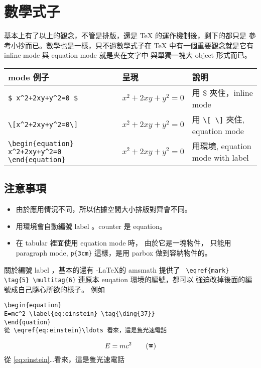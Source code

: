 \chapter{數學式子}
基本上有了以上的觀念，不管是排版，還是 {\TeX} 的運作機制後，剩下的都只是
參考小抄而已。數學也是一樣，只不過數學式子在 {\TeX} 中有一個重要觀念就是它有
inline mode 與 equation mode 就是夾在文字中 與單獨一塊大 object 形式而已。
\begin{center}
\begin{tabular}{m{3cm}m{4cm}m{3cm}}
mode 例子 & 呈現 & 說明\\
\hline
\verb|$ x^2+2xy+y^2=0 $|&$x^2+2xy+y^2=0 $& 用 \$ 夾住，inline mode\\
\verb|\[x^2+2xy+y^2=0\]|&\[x^2+2xy+y^2=0\]& 用 \verb=\[ \]= 夾住, equation mode\\
\verb|\begin{equation}|
\verb|x^2+2xy+y^2=0|
\verb|\end{equation}|&\begin{equation}x^2+2xy+y^2=0\end{equation}&
	 用環境, equation mode with label \\
\end{tabular}
\end{center}

\section{注意事項}
\begin{itemize}
\item 由於應用情況不同，所以佔據空間大小排版對齊會不同。
\item 用環境會自動編號 label 。counter 是 equation。
\item 在 tabular 裡面使用 equation mode 時， 由於它是一塊物件，
      只能用 paragraph mode, \verb|p{3cm}| 這樣，是用 parbox 做到容納物件的。
\end{itemize}
關於編號 label ，基本的還有 \AmS-\LaTeX 的 amsmath 提供了 
\verb| \eqref{mark} \tag{5} \multitag{6}| 連原本 euqation 環境的編號，都可以
強迫改掉後面的編號成自己隨心所欲的樣子。 例如
\begin{verbatim}
\begin{equation}
E=mc^2 \label{eq:einstein} \tag{\ding{37}}
\end{quation}
從 \eqref{eq:einstein}\ldots 看來，這是隻光速電話
\end{verbatim}
\begin{equation}
E=mc^2 \label{eq:einstein} \tag{\ding{37}}
\end{equation}
從 \eqref{eq:einstein}\ldots 看來，這是隻光速電話

